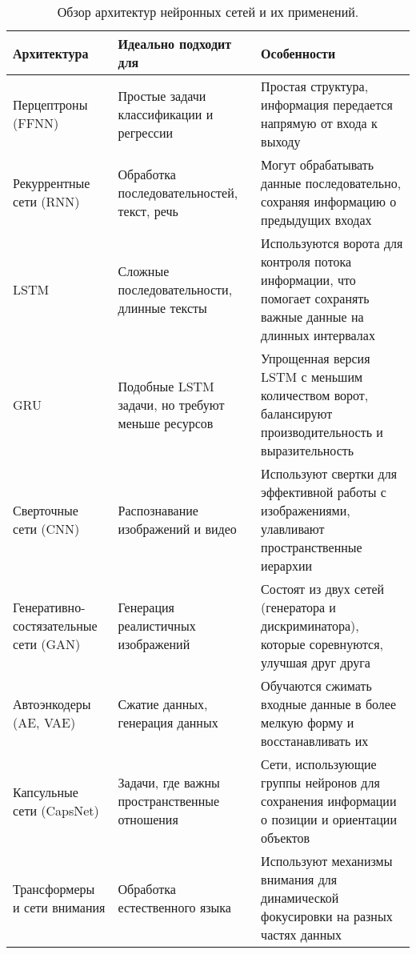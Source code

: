 \begin{table}[h]
	\centering
	{\tiny
		\begin{tabular}{|>{\raggedright\arraybackslash}p{3.2cm}|>{\raggedright\arraybackslash}p{3.5cm}|>{\raggedright\arraybackslash}p{6cm}|}
			\hline
			\textbf{Архитектура} & \textbf{Идеально подходит для} & \textbf{Особенности} \\
			\hline
			Перцептроны (FFNN) & Простые задачи классификации и регрессии & Простая структура, информация передается напрямую от входа к выходу \\
			\hline
			Рекуррентные сети (RNN) & Обработка последовательностей, текст, речь & Могут обрабатывать данные последовательно, сохраняя информацию о предыдущих входах \\
			\hline
			LSTM & Сложные последовательности, длинные тексты & Используются ворота для контроля потока информации, что помогает сохранять важные данные на длинных интервалах \\
			\hline
			GRU & Подобные LSTM задачи, но требуют меньше ресурсов & Упрощенная версия LSTM с меньшим количеством ворот, балансируют производительность и выразительность \\
			\hline
			Сверточные сети (CNN) & Распознавание изображений и видео & Используют свертки для эффективной работы с изображениями, улавливают пространственные иерархии \\
			\hline
			Генеративно-состязательные сети (GAN) & Генерация реалистичных изображений & Состоят из двух сетей (генератора и дискриминатора), которые соревнуются, улучшая друг друга \\
			\hline
			Автоэнкодеры (AE, VAE) & Сжатие данных, генерация данных & Обучаются сжимать входные данные в более мелкую форму и восстанавливать их \\
			\hline
			Капсульные сети (CapsNet) & Задачи, где важны пространственные отношения & Сети, использующие группы нейронов для сохранения информации о позиции и ориентации объектов \\
			\hline
			Трансформеры и сети внимания & Обработка естественного языка & Используют механизмы внимания для динамической фокусировки на разных частях данных \\
			\hline
		\end{tabular}
	}
	\caption{Обзор архитектур нейронных сетей и их применений.}
	\label{tab:ArchitecturesTable}
\end{table}